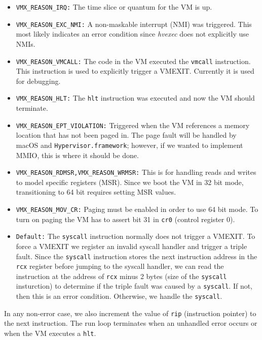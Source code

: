\documentclass{article}
\newcommand{\PROJNAME}{\textit{hvexec}}
\begin{document}
\begin{itemize}
    \item \texttt{VMX\_REASON\_IRQ:}
        The time slice or quantum for the VM is up.
    \item \texttt{VMX\_REASON\_EXC\_NMI:}
        A non-maskable interrupt (NMI) was triggered. This most likely indicates an error condition since \PROJNAME{} does not explicitly use NMIs.
    \item \texttt{VMX\_REASON\_VMCALL:}
        The code in the VM executed the \texttt{vmcall} instruction. This instruction is used to explicitly trigger a VMEXIT. Currently it is used for debugging.
    \item \texttt{VMX\_REASON\_HLT:}
        The \texttt{hlt} instruction was executed and now the VM should terminate.
    \item \texttt{VMX\_REASON\_EPT\_VIOLATION:}
        Triggered when the VM references a memory location that has not been paged in. The page fault will be handled by macOS and \texttt{Hypervisor.framework}; however, if we wanted to implement MMIO, this is where it should be done.
    \item \texttt{VMX\_REASON\_RDMSR,VMX\_REASON\_WRMSR:}
        This is for handling reads and writes to model specific registers (MSR). Since we boot the VM in 32 bit mode, transitioning to 64 bit requires setting MSR values.
    \item \texttt{VMX\_REASON\_MOV\_CR:}
        Paging must be enabled in order to use 64 bit mode. To turn on paging the VM has to assert bit 31 in \texttt{cr0} (control register 0).
    \item \texttt{Default:}
        The \texttt{syscall} instruction normally does not trigger a VMEXIT. To force a VMEXIT we register an invalid syscall handler and trigger a triple fault. 
        Since the \texttt{syscall} instruction stores the next instruction address in the \texttt{rcx} register before jumping to the syscall handler, we can read the instruction at the address of \texttt{rcx} minus 2 bytes (size of the \texttt{syscall} insturction) to determine if the triple fault was caused by a \texttt{syscall}. If not, then this is an error condition. Otherwise, we handle the \texttt{syscall}.
\end{itemize}

In any non-error case, we also increment the value of \texttt{rip} (instruction pointer) to the next instruction. The run loop terminates when an unhandled error occurs or when the VM executes a \texttt{hlt}. 
 
\end{document}
